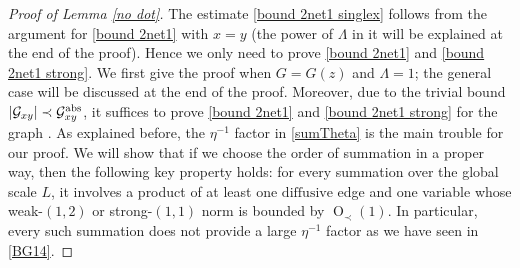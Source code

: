 \documentclass{article}
\newcommand{\1}{\mathds{1}}
\numberwithin{equation}{section}
\newcommand{\e}{{\varepsilon}}
\renewcommand{\cal}{\mathcal}
\newcommand{\dashed}{\text{diffusive}}
\newcommand{\abs}{{\rm abs}}%
\DeclareMathOperator{\OO}{O}
\theoremstyle{plain} %
\theoremstyle{remark}
\begin{document}
 \begin{proof} [Proof of Lemma \ref{no dot}]
The estimate \eqref{bound 2net1 singlex} follows from the argument for \eqref{bound 2net1} with $x=y$ (the power of $\Lambda$ in it will be explained at the end of the proof). Hence we only need to prove \eqref{bound 2net1} and \eqref{bound 2net1 strong}. We first give the proof when $G=G(z)$ and $\Lambda=1$; the general case will be discussed at the end of the proof. Moreover, due to the trivial bound $|\cal G_{xy}|\prec \cal G^{\abs}_{xy}$, it suffices to prove \eqref{bound 2net1} and \eqref{bound 2net1 strong} for the graph \smash{$\cal G_{xy}^{\abs}$}. %
As explained before, the $\eta^{-1}$ factor in \eqref{sumTheta} is the main trouble for our proof. %
We will show that if we choose the order of summation in a proper way, then the following key property holds: for every summation over the global scale $L$, it involves a product of at least one $\dashed$ edge and one variable whose weak-$(1,2)$ or strong-$(1,1)$ norm is bounded by $\OO_\prec(1)$. In particular, every such summation does not provide a large $\eta^{-1}$ factor as we have seen in \eqref{BG14}.




\end{proof}
\end{document}
